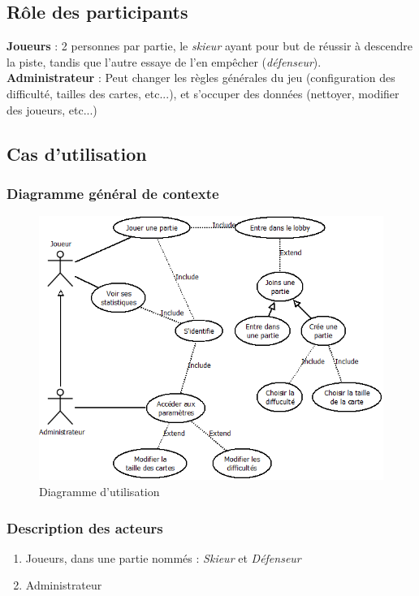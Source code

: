 \documentclass[a4paper,12pt]{article}
\begin{document}
	
	\subsection{Rôle des participants}
	\textbf{Joueurs} : 2 personnes par partie, le \textit{skieur} ayant pour but de réussir à descendre la piste, tandis que l'autre essaye de l'en empêcher (\textit{défenseur}). \\
	
	\textbf{Administrateur} : Peut changer les règles générales du jeu (configuration des difficulté, tailles des cartes, etc...), et s'occuper des données (nettoyer, modifier des joueurs, etc...)
	
	
	\subsection{Cas d'utilisation}
	
	\subsubsection{Diagramme général de contexte}
	\begin{figure}[!ht]
		\centering
		\includegraphics[scale=0.6]{diagramme_utilisation.png}
		\caption{Diagramme d'utilisation}
		\label{fig:diagramme_utilisation}
	\end{figure}

	\subsubsection{Description des acteurs}
	\begin{enumerate}
		\item Joueurs, dans une partie nommés : \textit{Skieur} et \textit{Défenseur}
		\item Administrateur
	\end{enumerate}
\end{document}
